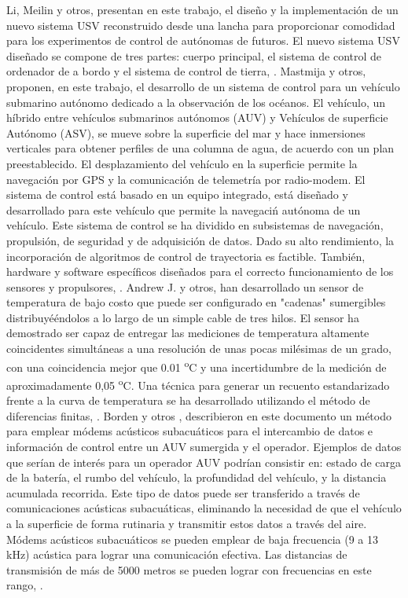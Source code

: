Li, Meilin y otros, presentan en este trabajo, el dise\~no y la implementaci\'on de un nuevo sistema USV reconstruido desde una lancha para proporcionar comodidad para los experimentos de control de aut\'onomas de futuros. El nuevo sistema USV dise\~nado se compone de tres partes: cuerpo principal, el sistema de control de ordenador de a bordo y el sistema de control de tierra, \cite{li2012design}. 
Mastmija y otros, proponen, en este trabajo, el desarrollo de un sistema de control para un veh\'iculo submarino autónomo dedicado a la observaci\'on de los oc\'eanos. El veh\'iculo, un h\'ibrido entre veh\'iculos submarinos aut\'onomos (AUV) y Veh\'iculos de superficie Aut\'onomo (ASV), se mueve sobre la superficie del mar y hace inmersiones verticales para obtener perfiles de una columna de agua, de acuerdo con un plan preestablecido. El desplazamiento del veh\'iculo en la superficie permite la navegaci\'on por GPS y la comunicaci\'on de telemetr\'ia por radio-modem. El sistema de control est\'a basado en un equipo integrado, est\'a dise\~nado y desarrollado para este veh\'iculo que permite la navegaci\'n aut\'onoma de un veh\'iculo. Este sistema de control se ha dividido en subsistemas de navegaci\'on, propulsi\'on, de seguridad y de adquisici\'on de datos. Dado su alto rendimiento, la incorporaci\'on de algoritmos de control de trayectoria es factible. Tambi\'en, hardware y software espec\'ificos dise\~nados para el correcto funcionamiento de los sensores y propulsores, \cite{masmitja2010development}.
Andrew J. y otros, han desarrollado un sensor de temperatura de bajo costo que puede ser configurado en "cadenas" sumergibles distribuyé\'endolos a lo largo de un simple cable de tres hilos. El sensor ha demostrado ser capaz de entregar las mediciones de temperatura altamente coincidentes simult\'aneas a una resoluci\'on de unas pocas mil\'esimas de un grado, con una coincidencia mejor que 0.01  \textsuperscript{o}C y una incertidumbre de la medici\'on de aproximadamente 0,05  \textsuperscript{o}C. Una t\'ecnica para generar un recuento estandarizado frente a la curva de temperatura se ha desarrollado utilizando el m\'etodo de diferencias finitas, \cite{skinner2006using}.
Borden  y otros ,  describieron en este documento un m\'etodo para emplear m\'odems ac\'usticos subacu\'aticos para el intercambio de datos e informaci\'on  de control entre un AUV sumergida y el operador. Ejemplos de datos que ser\'ian de  inter\'es para un operador AUV podr\'ian consistir en: estado de carga de la bater\'ia, el rumbo del veh\'iculo, la profundidad del veh\'iculo, y la distancia acumulada recorrida. Este  tipo de datos puede ser transferido a través de comunicaciones acústicas subacu\'aticas, eliminando la  necesidad de que el veh\'iculo a la superficie de forma rutinaria y transmitir estos datos a trav\'es del aire. M\'odems ac\'usticos subacuáticos se pueden emplear de baja frecuencia (9 a 13 kHz) ac\'ustica para lograr  una comunicación efectiva. Las distancias de transmisi\'on de m\'as de 5000 metros se  pueden lograr con frecuencias en este rango, \cite{borden2012long}.

